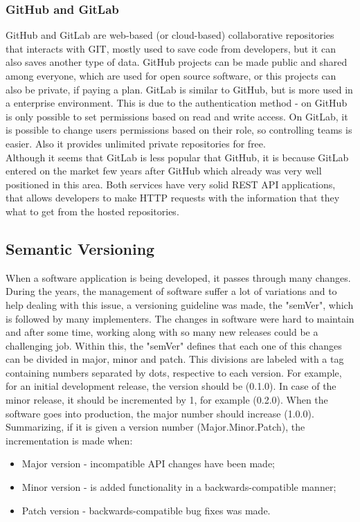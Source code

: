 \documentclass[mim_thesis.tex]{subfiles}
\begin{document}
\subsubsection{GitHub and GitLab}

GitHub and GitLab are web-based (or cloud-based) collaborative repositories that interacts with GIT, mostly used to save code from developers, but it can also saves another type of data. GitHub projects can be made public and shared among everyone, which are used for open source software, or this projects can also be private, if paying a plan. 
GitLab is similar to GitHub, but is more used in a enterprise environment. This is due to the authentication method - on GitHub is only possible to set permissions based on read and write access. On GitLab, it is possible to change users permissions based on their role, so controlling teams is easier. Also it provides unlimited private repositories for free. \\

Although it seems that GitLab is less popular that GitHub, it is because GitLab entered on the market few years after GitHub which already was very well positioned in this area. Both services have very solid REST API applications, that allows developers to make HTTP requests with the information that they what to get from the hosted repositories. 


\subsection{Semantic Versioning}
When a software application is being developed, it passes through many changes. During the years, the management of software suffer a lot of variations and to help dealing with this issue, a versioning guideline was made, the "semVer", which is followed by many implementers. The changes in software were hard to maintain and after some time, working along with so many new releases could be a challenging job. Within this, the "semVer" defines that each one of this changes can be divided in major, minor and patch. This divisions are labeled with a tag containing numbers separated by dots, respective to each version. For example, for an initial development release, the version should be (0.1.0). In case of the minor release, it should be incremented by 1, for example (0.2.0). When the software goes into production, the major number should increase (1.0.0). Summarizing, if it is given a version number (Major.Minor.Patch), the incrementation is made when: \citep{preston2018}
\begin{itemize} [noitemsep]
\item Major version - incompatible API changes have been made;
\item Minor version - is added functionality in a backwards-compatible manner;
\item Patch version - backwards-compatible bug fixes was made.
\end{itemize}
\end{document}
